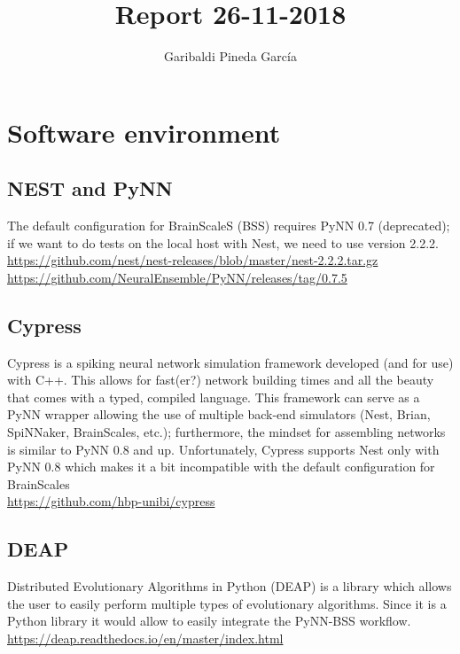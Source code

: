 \documentclass[11pt,a4paper]{article}
\author{Garibaldi Pineda Garc{\'i}a}
\title{Report 26-11-2018}
\begin{document}
\maketitle

\section{Software environment}
\subsection{NEST and PyNN}
The default configuration for BrainScaleS (BSS) requires PyNN 0.7 (deprecated); if we want to do tests on the local host with Nest, we need to use version 2.2.2.\\


\url{https://github.com/nest/nest-releases/blob/master/nest-2.2.2.tar.gz}\\

\url{https://github.com/NeuralEnsemble/PyNN/releases/tag/0.7.5}\\

\subsection{Cypress}
Cypress is a spiking neural network simulation framework developed (and for use) with C++.
This allows for fast(er?) network building times and all the beauty that comes with a typed, compiled language.
This framework can serve as a PyNN wrapper allowing the use of  multiple back-end simulators (Nest, Brian, SpiNNaker, BrainScales, etc.); furthermore, the mindset for assembling networks is similar to PyNN 0.8 and up.
Unfortunately, Cypress supports Nest only with PyNN 0.8 which makes it a bit incompatible with the default configuration for BrainScales\\


\url{https://github.com/hbp-unibi/cypress}

\subsection{DEAP}

Distributed Evolutionary Algorithms in Python (DEAP) is a library which allows the user to easily perform multiple types of evolutionary algorithms. 
Since it is a Python library it would allow to easily integrate the PyNN-BSS workflow.\\ 

\url{https://deap.readthedocs.io/en/master/index.html}
\end{document}
